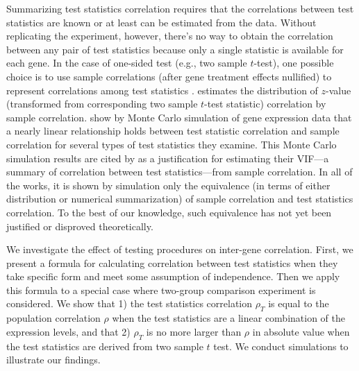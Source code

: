 	Summarizing test statistics correlation requires that the correlations between test statistics 
	are known or at least can be estimated from the data. Without 
	replicating the experiment, however, there's no way to obtain the correlation between any pair 
	of test statistics because only a single  statistic is available for each gene. In the case of 
	one-sided test (e.g., two sample $t$-test), one possible choice is to use sample 
	correlations (after gene treatment effects nullified) to represent correlations among test 
	statistics \citep{barry2008statistical, efron2007correlation, wu2012camera, 
		yaari2013quantitative}. 
	\citet{efron2007correlation} estimates the distribution of $z$-value (transformed from 
	corresponding two sample $t$-test statistic) 
	correlation by sample correlation. \citet{barry2008statistical} show by Monte Carlo simulation 
	of gene expression data that a nearly linear 
	relationship holds between test statistic correlation and sample correlation for several types 
	of test statistics they examine.  This Monte Carlo simulation results are cited by 
	\citet{wu2012camera} as a justification for estimating their VIF---a summary of correlation 
	between test statistics---from sample correlation.
	In all of the 
	works, it is shown by simulation only the 
	equivalence (in terms of either distribution or numerical summarization) of sample correlation  
	and test statistics	correlation. 
	To the best of our knowledge, such equivalence has not yet been justified or disproved 
	theoretically.
	
	
	We investigate the effect of testing procedures on inter-gene correlation. First, we present a 
	formula for calculating correlation between test statistics when they take specific form and 
	meet some assumption of independence. Then we apply this formula to a special case where 
	two-group comparison experiment is considered. We show that 1) the test statistics correlation 
	$\rho_T$ is equal to the population correlation $\rho$ when the test statistics are a linear 
	combination of the expression levels, and that 2) $\rho_T$ is no more larger than $\rho$ in 
	absolute value when the test statistics are derived from two sample $t$ test. We conduct 
	simulations to illustrate our findings.
	
